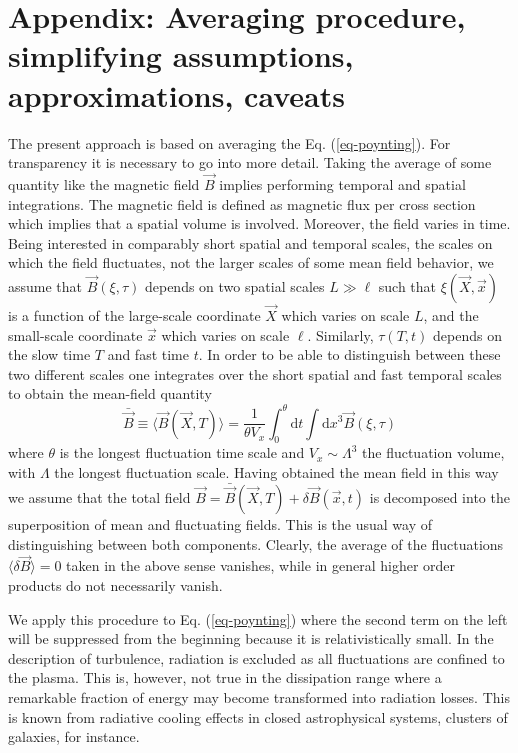 \documentclass[ ]{copernicus2}
\begin{document}
{{{\section*{{Appendix: Averaging procedure, simplifying assumptions, approximations, caveats}}
{The present approach is based on averaging the Eq. (\ref{eq-poynting}). For transparency it is necessary to go into more detail. Taking the average of some quantity like the magnetic field $\vec{B}$ implies performing temporal and spatial integrations. The magnetic field is defined as magnetic flux per cross section which implies that a spatial volume is involved. Moreover, the field varies in time. Being interested in comparably short spatial and temporal scales, the scales on which the field fluctuates, not the larger scales of some mean field behavior, we assume that $\vec{B}(\xi,\tau)$ depends on two spatial scales $L\gg\ell$ such that $\xi(\vec{X},\vec{x})$ is a function of the large-scale coordinate $\vec{X}$ which varies on scale $L$, and the small-scale coordinate $\vec{x}$ which varies on scale $\ell$. Similarly, $\tau(T,t)$ depends on the slow time $T$ and fast time $t$. In order to be able to distinguish between these two different scales one integrates over the short spatial and fast temporal scales to obtain the mean-field quantity
\begin{equation}
\bar{\vec{B}}\equiv\big\langle\vec{B}(\vec{X},T)\big\rangle = \frac{1}{\theta V_x}\int_0^{\theta}\mathrm{d}t\int\mathrm{d}x^3\vec{B}(\xi,\tau)
\end{equation}
where $\theta$ is the longest fluctuation time scale and $V_x\sim \Lambda^3$ the fluctuation volume, with $\Lambda$ the longest fluctuation scale. Having obtained the mean field in this way we assume that the total field $\vec{B}=\bar{\vec{B}}(\vec{X},T)+\delta\vec{B}(\vec{x},t)$ is decomposed into the superposition of mean and fluctuating fields. This is the usual way of distinguishing between both components. Clearly, the average of the fluctuations $\big\langle\delta\vec{B}\big\rangle=0$ taken in the above sense vanishes, while in general higher order products do not necessarily vanish.}

{We apply this procedure to Eq. (\ref{eq-poynting}) where the second term on the left will be suppressed from the beginning because it is relativistically small. In the description of turbulence, radiation is excluded as all fluctuations are confined to the plasma. This is, however, not true in the dissipation range where a remarkable fraction of energy may become transformed into radiation losses. This is known from radiative cooling effects in closed astrophysical systems, clusters of galaxies, for instance.}

}}}
\end{document}
